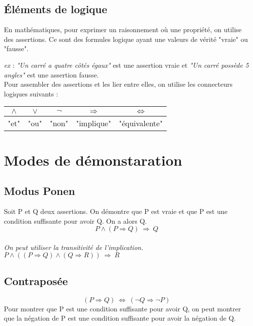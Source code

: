     \subsection{Éléments de logique}

        En mathématiques, pour exprimer un raisonnement où une propriété, on utilise des assertions. Ce sont des formules logique ayant une valeurs de vérité "vraie" ou "fausse".

        \emph{ex} : \textsl{"Un carré a quatre côtés égaux"} est une assertion vraie et \textsl{"Un carré possède 5 angles"} est une assertion fausse. \\
        
        Pour assembler des assertions et les lier entre elles, on utilise les connecteurs logiques suivants :
        \begin{table}[htbp]
            \centering
            \begin{tabular}{|c|c|c|c|c|}
                \toprule
                $\wedge$ & $\vee$ & $\neg$ & $\Rightarrow$ & $\Leftrightarrow$ \\
                \midrule
                "et" & "ou" & "non" & "implique" & "équivalente" \\
                \bottomrule
            \end{tabular}
        \end{table}


\section{Modes de démonstaration}

    \subsection{Modus Ponen}
        Soit P et Q deux assertions. On démontre que P est vraie et que P est une condition suffisante pour avoir Q. On a alors Q.
        \\$$P\wedge (P\Rightarrow Q)~\Rightarrow ~Q$$
        \\\textsl{On peut utiliser la transitivité de l'implication. $P\wedge ((P\Rightarrow Q)\wedge (Q\Rightarrow R))~\Rightarrow ~R$}

    \subsection{Contraposée}
        $$(P\Rightarrow Q)~\Longleftrightarrow ~(\neg Q\Rightarrow\neg P)$$
        Pour montrer que P est une condition suffisante pour avoir Q, on peut montrer que la négation de P est une condition suffisante pour avoir la négation de Q.

